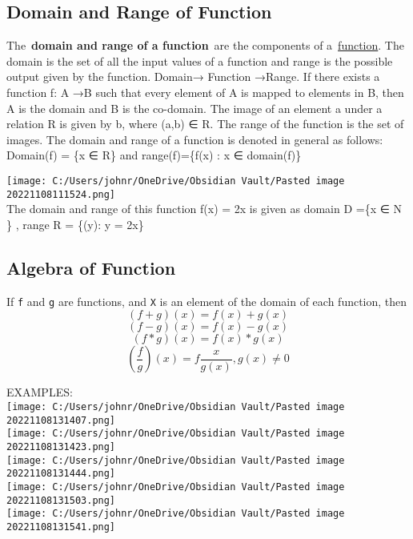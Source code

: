 \documentclass[
]{article}
\begin{document}
\hypertarget{domain-and-range-of-function}{%
\subsection{Domain and Range of
Function}\label{domain-and-range-of-function}}

The~\textbf{domain and range of a function}~are the components of
a~\href{https://www.cuemath.com/calculus/What-are-functions/}{function}.
The domain is the set of all the input values of a function and range is
the possible output given by the function. Domain→ Function →Range. If
there exists a function f: A →B such that every element of A is mapped
to elements in B, then A is the domain and B is the co-domain. The image
of an element \textquotesingle a\textquotesingle{} under a relation R is
given by \textquotesingle b\textquotesingle, where (a,b) ∈ R. The range
of the function is the set of images. The domain and range of a function
is denoted in general as follows: Domain(f) = \{x ∈ R\} and
range(f)=\{f(x) : x ∈ domain(f)\}

\texttt{[image: C:/Users/johnr/OneDrive/Obsidian Vault/Pasted image 20221108111524.png]}\\
The domain and range of this function f(x) = 2x is given as domain D
=\{x ∈ N \} , range R = \{(y): y = 2x\}

\hypertarget{algebra-of-function}{%
\subsection{Algebra of Function}\label{algebra-of-function}}

If \texttt{f} and \texttt{g} are functions, and \texttt{X} is an element
of the domain of each function, then\\
{\[(f + g)(x) = f(x) + g(x)\]}{\[(f - g)(x) = f(x) - g(x)\]}{\[(f \ast g)(x) = f(x) \ast g(x)\]}{\[(\frac{f}{g})(x) = f\frac{x}{g(x)},g(x) \neq 0\]}

EXAMPLES:\\
\texttt{[image: C:/Users/johnr/OneDrive/Obsidian Vault/Pasted image 20221108131407.png]}\\
\texttt{[image: C:/Users/johnr/OneDrive/Obsidian Vault/Pasted image 20221108131423.png]}\\
\texttt{[image: C:/Users/johnr/OneDrive/Obsidian Vault/Pasted image 20221108131444.png]}\\
\texttt{[image: C:/Users/johnr/OneDrive/Obsidian Vault/Pasted image 20221108131503.png]}\\
\texttt{[image: C:/Users/johnr/OneDrive/Obsidian Vault/Pasted image 20221108131541.png]}
\end{document}
